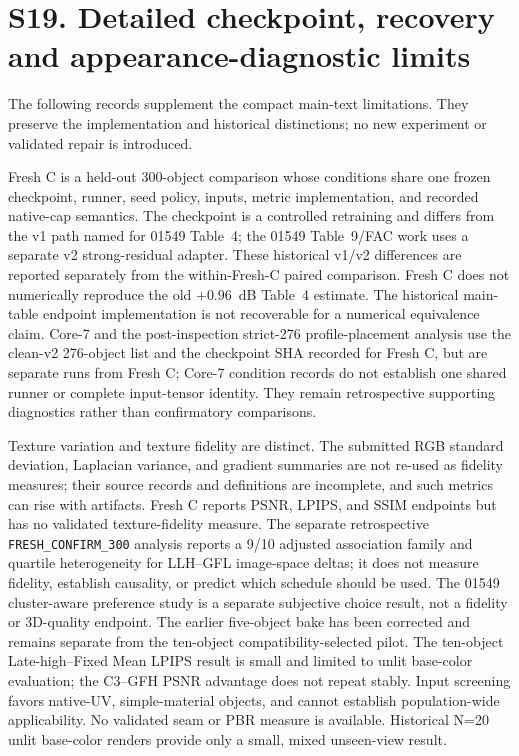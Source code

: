 \documentclass[11pt]{article}
\begin{document}
\clearpage
\section*{S19. Detailed checkpoint, recovery and appearance-diagnostic limits}
The following records supplement the compact main-text limitations. They preserve the implementation and historical distinctions; no new experiment or validated repair is introduced.

Fresh C is a held-out 300-object comparison whose conditions share one frozen checkpoint, runner, seed policy, inputs, metric implementation, and recorded native-cap semantics. The checkpoint is a controlled retraining and differs from the v1 path named for 01549 Table~4; the 01549 Table~9/FAC work uses a separate v2 strong-residual adapter. These historical v1/v2 differences are reported separately from the within-Fresh-C paired comparison. Fresh C does not numerically reproduce the old $+0.96$~dB Table~4 estimate. The historical main-table endpoint implementation is not recoverable for a numerical equivalence claim. Core-7 and the post-inspection strict-276 profile-placement analysis use the clean-v2 276-object list and the checkpoint SHA recorded for Fresh C, but are separate runs from Fresh C; Core-7 condition records do not establish one shared runner or complete input-tensor identity. They remain retrospective supporting diagnostics rather than confirmatory comparisons.

Texture variation and texture fidelity are distinct. The submitted RGB standard deviation, Laplacian variance, and gradient summaries are not re-used as fidelity measures; their source records and definitions are incomplete, and such metrics can rise with artifacts. Fresh C reports PSNR, LPIPS, and SSIM endpoints but has no validated texture-fidelity measure. The separate retrospective \texttt{FRESH\_CONFIRM\_300} analysis reports a 9/10 adjusted association family and quartile heterogeneity for LLH--GFL image-space deltas; it does not measure fidelity, establish causality, or predict which schedule should be used. The 01549 cluster-aware preference study is a separate subjective choice result, not a fidelity or 3D-quality endpoint. The earlier five-object bake has been corrected and remains separate from the ten-object compatibility-selected pilot. The ten-object Late-high--Fixed Mean LPIPS result is small and limited to unlit base-color evaluation; the C3--GFH PSNR advantage does not repeat stably. Input screening favors native-UV, simple-material objects, and cannot establish population-wide applicability. No validated seam or PBR measure is available. Historical N=20 unlit base-color renders provide only a small, mixed unseen-view result.
\end{document}
